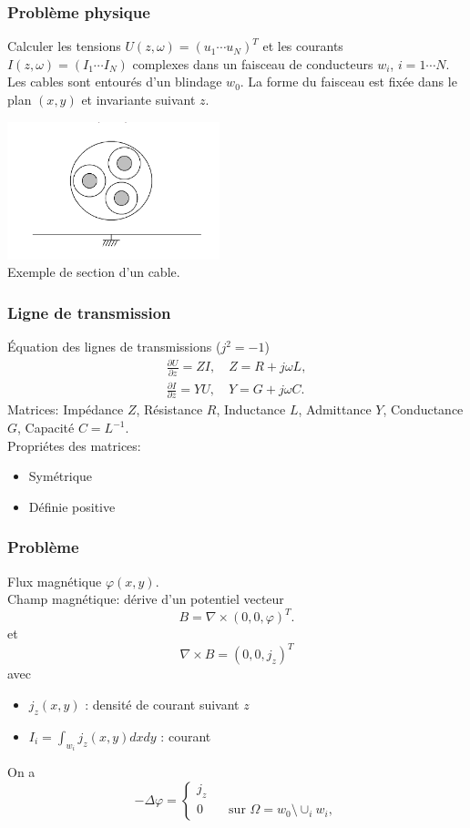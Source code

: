 \begin{frame}
  \frametitle{Probl\`eme physique}
  Calculer les tensions $U(z,\omega) =(u_1 \cdots u_N)^T$ et les courants
  $I(z,\omega) = (I_1\cdots I_N)$ complexes dans un faisceau de conducteurs
  $w_i$, $i=1\cdots N$. Les cables sont entour\'es d'un blindage $w_0$. La forme
  du faisceau est fix\'ee dans le plan $(x,y)$ et invariante suivant $z$.
  \begin{center}
    \includegraphics[height=4cm]{figures/figures/f1}\\
    \small  Exemple de section d'un cable.
  \end{center}
\end{frame}


\begin{frame}
\frametitle{Ligne de transmission}
\'Equation des lignes de transmissions ($j^2=-1$)
\begin{eqnarray*}
\frac{\partial U}{\partial z} =ZI, \quad Z=R+j\omega L,\\
\frac{\partial I}{\partial z} =YU, \quad Y=G+j\omega C.
\end{eqnarray*}
Matrices: 
Imp\'edance $Z$, R\'esistance $R$, Inductance $L$, Admittance $Y$, Conductance $G$, Capacit\'e
$C=L^{-1}.$\\[0.4cm]
Propri\'etes des matrices: 
\begin{itemize}
\item Sym\'etrique
\item D\'efinie positive
\end{itemize}

\end{frame} 

\begin{frame}
\frametitle{Probl\`eme}
Flux magn\'etique $\varphi(x,y)$. \\
Champ magn\'etique: d\'erive d'un potentiel vecteur 
$$B=\nabla \times (0,0,\varphi)^T.$$ et
$$\nabla\times B=(0,0,j_z)^T$$ avec
\begin{itemize}
\item  $j_z(x,y)$ : densit\'e de courant suivant $z$
\item  $I_i= \int _{w_i}j_z(x,y)dxdy$ :  courant
\end{itemize}
On a
\begin{equation}
-\Delta\varphi =
\begin{cases}
j_z \\ 
0 \qquad \text{sur } \Omega =w_0 \setminus \cup_i w_i,
\end{cases}
\end{equation} 
\end{frame}

